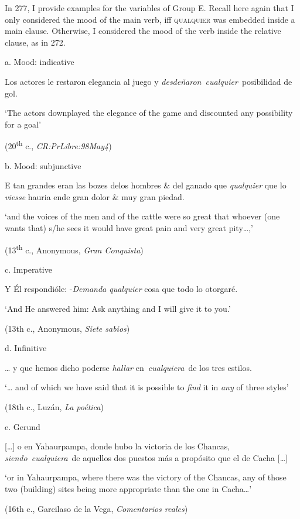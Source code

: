 \documentclass[output=paper]{langscibook}
\begin{document}
In 277, I provide examples for the variables of Group E. Recall here again that I only considered the mood of the main verb, iff \textsc{qualquier} was embedded inside a main clause. Otherwise, I considered the mood of the verb inside the relative clause, as in 272.

  a.  Mood: indicative

    Los actores le restaron elegancia al juego y \textit{desdeñaron~cualquier}~posibilidad de gol. 

    ‘The actors downplayed the elegance of the game and discounted any possibility for a goal’

    (20\textsuperscript{th} c., \textit{CR:PrLibre:98May4})

  b.  Mood: subjunctive

    E tan grandes eran las bozes delos hombres \& del ganado que \textit{qualquier} que lo \textit{viesse} hauria ende gran dolor \& muy gran piedad. 

    ‘and the voices of the men and of the cattle were so great that whoever (one wants that) s/he sees it would have great pain and very great pity…,’

    (13\textsuperscript{th} c., Anonymous, \textit{Gran Conquista})

  c.  Imperative

    Y Él respondióle: -\textit{Demanda qualquier} cosa que todo lo otorgaré. 

    ‘And He answered him: Ask anything and I will give it to you.’

    (13th c., Anonymous, \textit{Siete sabios})

  d.  Infinitive

    … y que hemos dicho poderse \textit{hallar} en~\textit{cualquiera}~de los tres estilos. 

    ‘… and of which we have said that it is possible to \textit{find} it in \textit{any} of three styles’

    (18th c., Luzán, \textit{La poética})

  e.  Gerund

    […] o en Yahaurpampa, donde hubo la victoria de los Chancas, \textit{siendo~cualquiera}~de aquellos dos puestos más a propósito que el de Cacha […] 

    ‘or in Yahaurpampa, where there was the victory of the Chancas, any of those two (building) sites being more appropriate than the one in Cacha…’

    (16th c., Garcilaso de la Vega, \textit{Comentarios reales})
\end{document}
